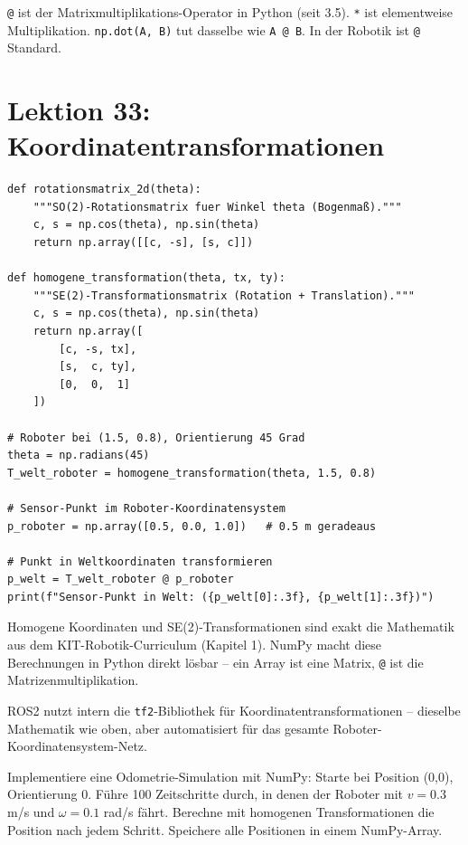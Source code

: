 \begin{merksatz}
\texttt{@} ist der Matrixmultiplikations-Operator in Python (seit 3.5). \texttt{*} ist elementweise Multiplikation. \texttt{np.dot(A, B)} tut dasselbe wie \texttt{A @ B}. In der Robotik ist \texttt{@} Standard.
\end{merksatz}

\section{Lektion 33: Koordinatentransformationen}

\begin{lstlisting}
def rotationsmatrix_2d(theta):
    """SO(2)-Rotationsmatrix fuer Winkel theta (Bogenmaß)."""
    c, s = np.cos(theta), np.sin(theta)
    return np.array([[c, -s], [s, c]])

def homogene_transformation(theta, tx, ty):
    """SE(2)-Transformationsmatrix (Rotation + Translation)."""
    c, s = np.cos(theta), np.sin(theta)
    return np.array([
        [c, -s, tx],
        [s,  c, ty],
        [0,  0,  1]
    ])

# Roboter bei (1.5, 0.8), Orientierung 45 Grad
theta = np.radians(45)
T_welt_roboter = homogene_transformation(theta, 1.5, 0.8)

# Sensor-Punkt im Roboter-Koordinatensystem
p_roboter = np.array([0.5, 0.0, 1.0])   # 0.5 m geradeaus

# Punkt in Weltkoordinaten transformieren
p_welt = T_welt_roboter @ p_roboter
print(f"Sensor-Punkt in Welt: ({p_welt[0]:.3f}, {p_welt[1]:.3f})")
\end{lstlisting}

\begin{praxis}
Homogene Koordinaten und SE(2)-Transformationen sind exakt die Mathematik aus dem KIT-Robotik-Curriculum (Kapitel 1). NumPy macht diese Berechnungen in Python direkt lösbar -- ein Array ist eine Matrix, \texttt{@} ist die Matrizenmultiplikation.
\end{praxis}

\begin{ros}
ROS2 nutzt intern die \texttt{tf2}-Bibliothek für Koordinatentransformationen -- dieselbe Mathematik wie oben, aber automatisiert für das gesamte Roboter-Koordinatensystem-Netz.
\end{ros}

\begin{uebung}[title=Projektaufgabe Modul 11: Odometrie-Berechnung]
Implementiere eine Odometrie-Simulation mit NumPy: Starte bei Position (0,0), Orientierung 0. Führe 100 Zeitschritte durch, in denen der Roboter mit $v = 0.3$ m/s und $\omega = 0.1$ rad/s fährt. Berechne mit homogenen Transformationen die Position nach jedem Schritt. Speichere alle Positionen in einem NumPy-Array.
\end{uebung}
